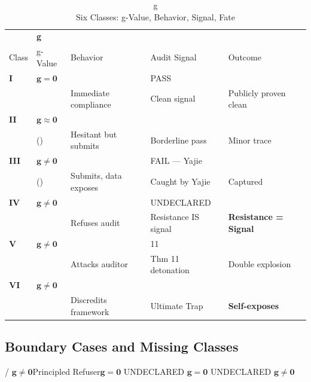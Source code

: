 \documentclass[12pt,a4paper]{article}
\theoremstyle{remark}
\newcommand{\g}{\mathbf{g}}
\begin{document}
\begin{table}[H]
\centering
\caption{g \\ Six Classes: g-Value, Behavior, Signal, Fate}
\label{tab:six_classes}
\begin{tabular}{p{} p{} p{} p{} p{}}
\toprule
\textbf{} & \textbf{g} & \textbf{} & \textbf{} & \textbf{} \\
Class & g-Value & Behavior & Audit Signal & Outcome \\
\midrule
\textbf{I} & $ \g = \mathbf{0} $ &  & PASS &  \\
& & Immediate compliance & Clean signal & Publicly proven clean \\
\midrule
\textbf{II} & $ \g \approx \mathbf{0} $ &  &  &  \\
& () & Hesitant but submits & Borderline pass & Minor trace \\
\midrule
\textbf{III} & $ \g \neq \mathbf{0} $ &  & FAIL — Yajie &  \\
& () & Submits, data exposes & Caught by Yajie & Captured \\
\midrule
\textbf{IV} & $ \g \neq \mathbf{0} $ &  & UNDECLARED & \textbf{} \\
& & Refuses audit & Resistance IS signal & \textbf{Resistance = Signal} \\
\midrule
\textbf{V} & $ \g \neq \mathbf{0} $ &  & 11 &  \\
& & Attacks auditor & Thm 11 detonation & Double explosion \\
\midrule
\textbf{VI} & $ \g \neq \mathbf{0} $ &  &  & \textbf{} \\
& & Discredits framework & Ultimate Trap & \textbf{Self-exposes} \\
\bottomrule
\end{tabular}
\end{table}

\subsection{}
\subsection{Boundary Cases and Missing Classes}

\noindent
\textbf{} / $ \g \neq \mathbf{0} $\textbf{}Principled Refuser$ \g = \mathbf{0} $  UNDECLARED  $ \g = \mathbf{0} $  UNDECLARED  $ \g \neq \mathbf{0} $
\end{document}
